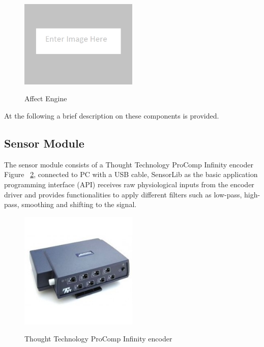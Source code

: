 \begin{figure}[h!]
  \caption[Affect Engine]
  {Affect Engine}
  \centering
  \includegraphics[width=0.5\textwidth]{images/placeholder.png}
  \label{fig:gsr-attached}
\end{figure}

At the following a brief description on these components is provided.

\subsection{Sensor Module} %
The sensor module consists of a Thought Technology ProComp Infinity encoder ~\cite{tt2013procomp} Figure ~\ref{fig:encoder}, connected to PC with a USB cable, SensorLib as the basic application programming interface (API) receives raw physiological inputs from the encoder driver and provides functionalities to apply different filters such as low-pass, high-pass, smoothing and shifting to the signal.

\begin{figure}[h!]
  \caption[Thought Technology ProComp Infinity Encoder]
  {Thought Technology ProComp Infinity encoder}
  \centering
  \includegraphics[width=0.5\textwidth]{images/encoder.png}
  \label{fig:encoder}
\end{figure}

